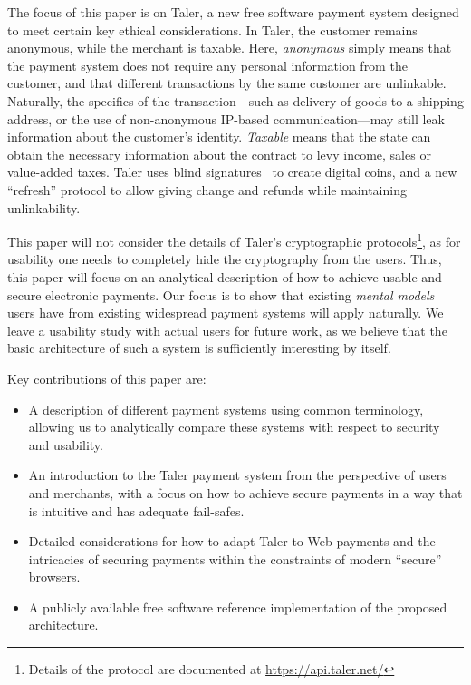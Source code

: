 \documentclass{IEEEtran}
\begin{document}
The focus of this paper is on Taler, a new free software payment
system designed to meet certain key ethical considerations. In Taler,
the customer remains anonymous, while the merchant is taxable.  Here,
{\em anonymous} simply means that the payment system does not require
any personal information from the customer, and that different
transactions by the same customer are unlinkable.  Naturally, the
specifics of the transaction---such as delivery of goods to a shipping
address, or the use of non-anonymous IP-based communication---may
still leak information about the customer's identity.  {\em Taxable}
means that the state can obtain the necessary information about the
contract to levy income, sales or value-added taxes.  Taler uses blind
signatures~\cite{chaum1983blind} to create digital coins, and a new
``refresh'' protocol to allow giving change and refunds while
maintaining unlinkability.

This paper will not consider the details of Taler's cryptographic
protocols\footnote{Details of the protocol are documented at \url{https://api.taler.net/}}, as
for usability one needs to completely hide the cryptography from the
users.  Thus, this paper will focus on an analytical description of
how to achieve usable and secure electronic payments.  Our focus is to
show that existing {\em mental models} users have from existing
widespread payment systems will apply naturally.  We leave a
usability study with actual users for future work, as we believe that
the basic architecture of such a system is sufficiently interesting by
itself.

Key contributions of this paper are:
\begin{itemize}
 \item A description of different payment systems using
  common terminology, allowing us to analytically compare
  these systems with respect to security and usability.
 \item An introduction to the Taler payment system from the
  perspective of users and merchants, with a focus on how
  to achieve secure payments in a way that is intuitive and
  has adequate fail-safes.
 \item Detailed considerations for how to adapt Taler to
  Web payments and the intricacies of securing payments
  within the constraints of modern ``secure'' browsers.
 \item A publicly available free software
  reference implementation of the proposed architecture.
\end{itemize}
\end{document}
